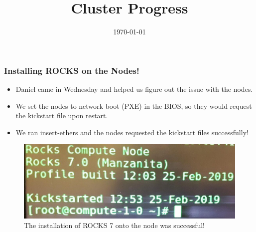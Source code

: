 \documentclass{beamer}
\title{Cluster Progress}
\date{\today}
\begin{document}

\begin{frame}
  \maketitle
\end{frame}



\begin{frame}

  \frametitle{Installing ROCKS on the Nodes!}

  \begin{itemize}
  \item Daniel came in Wednesday and helped us figure out the issue with the nodes. 
  \item We set the nodes to network boot (PXE) in the BIOS, so they would request the kickstart file upon restart. 
    \item We ran insert-ethers and the nodes requested the kickstart files successfully! 
  \end{itemize}

  \begin{figure}[H]
    \begin{center}
      \includegraphics[scale=0.2]{compute-1-0.png}
    \end{center}
    \caption{The installation of ROCKS 7 onto the node was successful!}
  \end{figure}

\end{frame}
\end{document}
